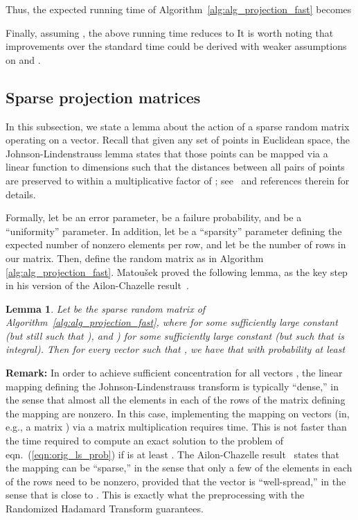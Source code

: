 \documentclass[11pt]{article}
\newtheorem{lemma}{Lemma}
\begin{document}
Thus, the expected running time of Algorithm~\ref{alg:alg_projection_fast} becomes

Finally, assuming , the above running time reduces to  It is worth noting that improvements over the standard  time could be derived with weaker assumptions on  and .

\subsection{Sparse projection matrices}
\label{sxn:review_previous:projecting}

In this subsection, we state a lemma about the action of a sparse random matrix operating on a vector. Recall that given any set of  points in Euclidean space, the Johnson-Lindenstrauss lemma states that those points can be mapped via a linear function to  dimensions such that the distances between all pairs of points are preserved to within a multiplicative factor of ; see~\cite{Matousek08_RSA} and references therein for details.

Formally, let  be an error parameter,  be a failure probability, and  be a ``uniformity'' parameter. In addition, let  be a ``sparsity'' parameter defining the expected number of nonzero elements per row, and let  be the number of rows in our matrix. Then, define the  random matrix  as in Algorithm
\ref{alg:alg_projection_fast}. Matou\v{s}ek proved the following lemma, as the key step in his version of the Ailon-Chazelle result~\cite{AC06,Matousek08_RSA}.

\begin{lemma}\label{lem:matousek}
Let  be the sparse random matrix of Algorithm~\ref{alg:alg_projection_fast}, where  for some sufficiently large constant  (but still such that ), and ) for some sufficiently large constant  (but such that  is integral). Then for every vector  such that , we have that with probability at least 

\end{lemma}

\noindent \textbf{Remark:} In order to achieve sufficient concentration for all vectors , the linear mapping defining the Johnson-Lindenstrauss transform is typically
``dense,'' in the sense that almost all the elements in each of the  rows of the matrix defining the mapping are nonzero. In this case, implementing the mapping on  vectors (in, e.g., a matrix ) via a matrix multiplication requires  time. This is not faster than the  time required to compute an exact solution to the problem of eqn.~(\ref{eqn:orig_ls_prob}) if  is at least . The Ailon-Chazelle result~\cite{AC06,Matousek08_RSA} states that the mapping can be ``sparse,'' in the sense that only a few of the elements in each of the  rows need to be nonzero, provided that the vector  is ``well-spread,'' in the sense that  is close to . This is exactly what the preprocessing with the Randomized Hadamard Transform guarantees.
\end{document}
